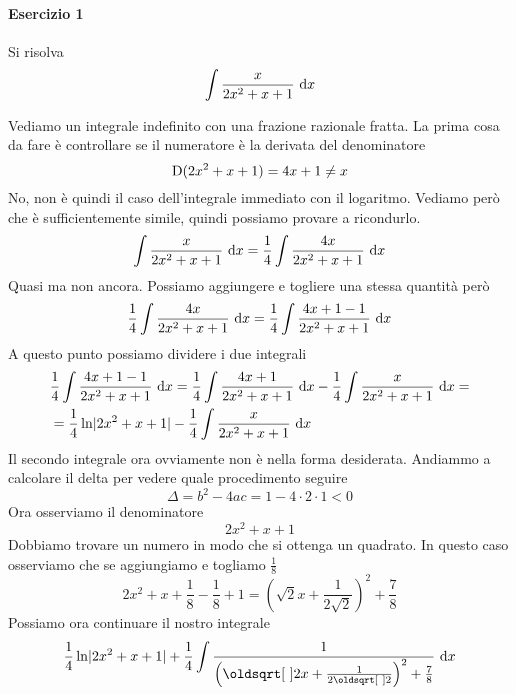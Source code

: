 \paragraph{Esercizio 1}
Si risolva
\begin{equation*}
  \int \frac{x}{2x^2+x+1}\,\mathop{}\!\mathrm{d} x
\end{equation*}
\divisor

Vediamo un integrale indefinito con una frazione razionale fratta. La prima cosa da fare è 
controllare se il numeratore è la derivata del denominatore
\begin{equation*}
  \mathop{}\!\mathrm{D} (2x^2+x+1) = 4x+1 \neq x
\end{equation*}
No, non è quindi il caso dell'integrale immediato con il logaritmo. Vediamo però che è 
sufficientemente simile, quindi possiamo provare a ricondurlo.
\begin{equation*}
  \int \frac{x}{2x^2+x+1}\,\mathop{}\!\mathrm{d} x = \frac{1}{4}\int \frac{4x}{2x^2+x+1}\,\mathop{}\!\mathrm{d} x
\end{equation*}
Quasi ma non ancora. Possiamo aggiungere e togliere una stessa quantità però
\begin{equation*}
  \frac{1}{4}\int \frac{4x}{2x^2+x+1}\,\mathop{}\!\mathrm{d} x = \frac{1}{4}\int \frac{4x+1-1}{2x^2+x+1}\,\mathop{}\!\mathrm{d} x
\end{equation*}
A questo punto possiamo dividere i due integrali
\begin{align*}
  &\frac{1}{4}\int \frac{4x+1-1}{2x^2+x+1}\,\mathop{}\!\mathrm{d} x = \frac{1}{4}\int \frac{4x+1}{2x^2+x+1}\,\mathop{}\!\mathrm{d} x
  - \frac{1}{4}\int \frac{x}{2x^2+x+1}\,\mathop{}\!\mathrm{d} x=\\
  &=\frac{1}{4}\ln\lvert2x^2+x+1\rvert - \frac{1}{4}\int \frac{x}{2x^2+x+1}\,\mathop{}\!\mathrm{d} x
\end{align*}
Il secondo integrale ora ovviamente non è nella forma desiderata. Andiammo a calcolare il delta
per vedere quale procedimento seguire
\begin{equation*}
  \Delta = b^2-4ac = 1 - 4\cdot2\cdot1 < 0
\end{equation*}
Ora osserviamo il denominatore
\begin{equation*}
  2x^2+x+1
\end{equation*}
Dobbiamo trovare un numero in modo che si ottenga un quadrato. In questo caso osserviamo che se 
aggiungiamo e togliamo $\frac{1}{8}$
\begin{equation*}
  2x^2+x+\frac{1}{8}-\frac{1}{8}+1 = \left( \sqrt{2}x + \frac{1}{2\sqrt{2}} \right)^2+\frac{7}{8}
\end{equation*}
Possiamo ora continuare il nostro integrale
\begin{equation*}
  \frac{1}{4}\ln\abs{2x^2+x+1} + 
  \frac{1}{4}\int \frac{1}{\left( \sqrt{2}x + \frac{1}{2\sqrt{2}} \right)^2+\frac{7}{8}}\,\dif x
\end{equation*}

